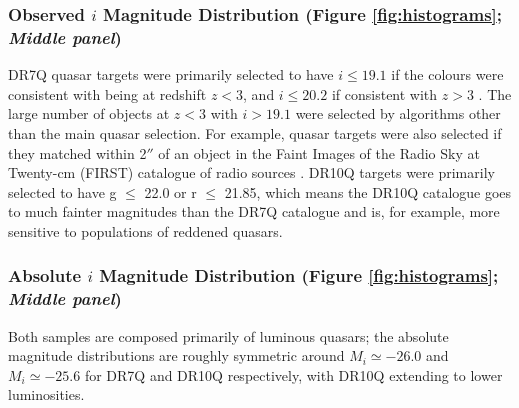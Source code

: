 \subsubsection{Observed $i$ Magnitude Distribution (Figure \ref{fig:histograms}; {\it Middle panel})}

DR7Q quasar targets were primarily selected to have $i \leq 19.1$ if the colours were consistent with being at redshift $z < 3$, and $i \leq 20.2$ if consistent with $z > 3$ \citep{richards02}. The large number of objects at $z < 3$ with $i > 19.1$ were selected by algorithms other than the main quasar selection. For example, quasar targets were also selected if they matched within 2$''$ of an object in the Faint Images of the Radio Sky at Twenty-cm (FIRST) catalogue of radio sources \citep{becker95}. DR10Q targets were primarily selected to have g $\leq$ 22.0 or r $\leq$ 21.85, which means the DR10Q catalogue goes to much fainter magnitudes than the DR7Q catalogue and is, for example, more sensitive to populations of reddened quasars. 

\subsubsection{Absolute $i$ Magnitude Distribution (Figure \ref{fig:histograms}; {\it Middle panel})}

Both samples are composed primarily of luminous quasars; the absolute magnitude distributions are roughly symmetric around $M_i \simeq -26.0$ and $M_i \simeq -25.6$ for DR7Q and DR10Q respectively, with DR10Q extending to lower luminosities.  


